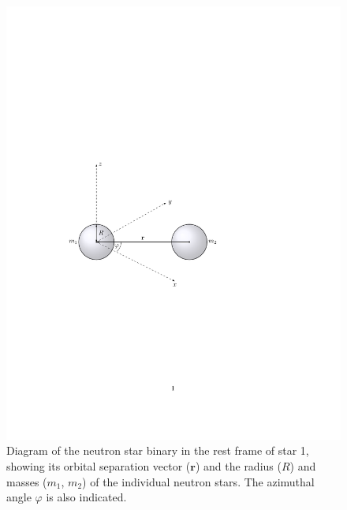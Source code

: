 \documentclass[11pt]{article}
\begin{document}
\begin{figure}[!h]
\begin{mdframed}
\centering
\includegraphics{relativistic_orbit/binary_diagram.pdf}
\caption{\label{fig:binary_diagram}Diagram of the neutron star binary in the rest frame of star 1, showing its orbital separation vector ($\mathbf{r}$) and the radius ($R$) and masses ($m_1$, $m_2$) of the individual neutron stars. The azimuthal angle $\varphi$ is also indicated.}
\end{mdframed}
\end{figure}

\vspace{1000pt}
\end{document}
